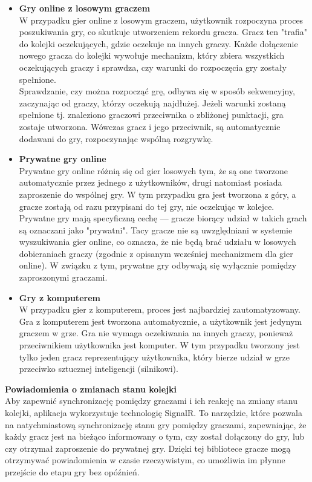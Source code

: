 \documentclass[12pt,a4paper]{article}
\begin{document}
\begin{itemize}
    \item \textbf{Gry online z losowym graczem}\\
    W przypadku gier online z losowym graczem, użytkownik rozpoczyna proces poszukiwania gry, co skutkuje utworzeniem rekordu gracza. Gracz ten "trafia" do kolejki oczekujących, gdzie oczekuje na innych graczy. Każde dołączenie nowego gracza do kolejki wywołuje mechanizm, który zbiera wszystkich oczekujących graczy i sprawdza, czy warunki do rozpoczęcia gry zostały spełnione.
    \\
    Sprawdzanie, czy można rozpocząć grę, odbywa się w sposób sekwencyjny, zaczynając od graczy, którzy oczekują najdłużej. Jeżeli warunki zostaną spełnione tj. znaleziono graczowi przeciwnika o zbliżonej punktacji, gra zostaje utworzona. Wówczas gracz i jego przeciwnik, są automatycznie dodawani do gry, rozpoczynając wspólną rozgrywkę.
    
    \item \textbf{Prywatne gry online}\\
    Prywatne gry online różnią się od gier losowych tym, że są one tworzone automatycznie przez jednego z użytkowników, drugi natomiast posiada zaproszenie do wspólnej gry. W tym przypadku gra jest tworzona z góry, a gracze zostają od razu przypisani do tej gry, nie oczekując w kolejce.
    \\
    Prywatne gry mają specyficzną cechę — gracze biorący udział w takich grach są oznaczani jako "prywatni". Tacy gracze nie są uwzględniani w systemie wyszukiwania gier online, co oznacza, że nie będą brać udziału w losowych dobieraniach graczy (zgodnie z opisanym wcześniej mechanizmem dla gier online). W związku z tym, prywatne gry odbywają się wyłącznie pomiędzy zaproszonymi graczami.

    \item \textbf{Gry z komputerem}\\
    W przypadku gier z komputerem, proces jest najbardziej zautomatyzowany. Gra z komputerem jest tworzona automatycznie, a użytkownik jest jedynym graczem w grze. Gra nie wymaga oczekiwania na innych graczy, ponieważ przeciwnikiem użytkownika jest komputer. W tym przypadku tworzony jest tylko jeden gracz reprezentujący użytkownika, który bierze udział w grze przeciwko sztucznej inteligencji (silnikowi).
\end{itemize}

\noindent \textbf{Powiadomienia o zmianach stanu kolejki}\\
Aby zapewnić synchronizację pomiędzy graczami i ich reakcję na zmiany stanu kolejki, aplikacja wykorzystuje technologię SignalR. To narzędzie, które pozwala na natychmiastową synchronizację stanu gry pomiędzy graczami, zapewniając, że każdy gracz jest na bieżąco informowany o tym, czy został dołączony do gry, lub czy otrzymał zaproszenie do prywatnej gry. Dzięki tej bibliotece gracze mogą otrzymywać powiadomienia w czasie rzeczywistym, co umożliwia im płynne przejście do etapu gry bez opóźnień.
\end{document}
